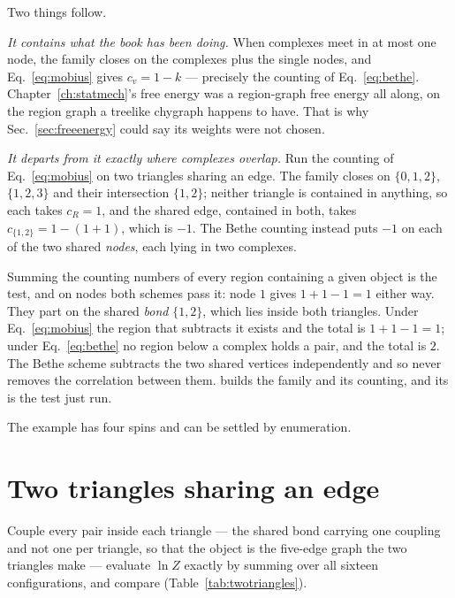 Two things follow.

\emph{It contains what the book has been doing.} When complexes meet in at most
one node, the family closes on the complexes plus the single nodes, and
Eq.~\eqref{eq:mobius} gives $c_{v}=1-k$ --- precisely the counting of
Eq.~\eqref{eq:bethe}. Chapter~\ref{ch:statmech}'s free energy was a region-graph
free energy all along, on the region graph a treelike chygraph happens to have.
That is why Sec.~\ref{sec:freeenergy} could say its weights were not chosen.

\emph{It departs from it exactly where complexes overlap.} Run the
counting of Eq.~\eqref{eq:mobius} on two triangles sharing an edge. The family closes on
$\{0,1,2\}$, $\{1,2,3\}$ and their intersection $\{1,2\}$; neither triangle is
contained in anything, so each takes $c_{R}=1$, and the shared edge, contained in
both, takes $c_{\{1,2\}}=1-(1+1)$, which is $-1$. The Bethe counting instead puts $-1$ on
each of the two shared \emph{nodes}, each lying in two complexes.

Summing the counting numbers of every region containing a given object is the
test, and on nodes both schemes pass it: node $1$ gives $1+1-1=1$ either way.
They part on the shared \emph{bond} $\{1,2\}$, which lies inside both triangles.
Under Eq.~\eqref{eq:mobius} the region that subtracts it exists and the total is
$1+1-1=1$; under Eq.~\eqref{eq:bethe} no region below a complex holds a pair,
and the total is $2$. The Bethe scheme subtracts the two shared vertices
independently and so never removes the correlation between them.
 builds the family and its counting, and
its  is the test just run.

The example has four spins and can be settled by enumeration.

\section{Two triangles sharing an edge}
\label{sec:twotriangles}

Couple every pair inside each triangle --- the shared bond carrying one coupling
and not one per triangle, so that the object is the five-edge graph the two
triangles make --- evaluate $\ln Z$ exactly by summing over all sixteen
configurations, and compare (Table~\ref{tab:twotriangles}).

